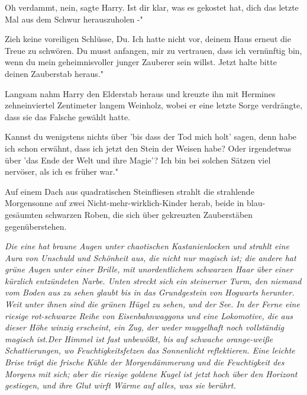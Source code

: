 \glqq Oh verdammt, nein\grqq{}, sagte Harry. \glqq Ist dir klar, was es gekostet
hat, dich das letzte Mal aus dem Schwur herauszuholen -"

\glqq Zieh keine voreiligen Schlüsse, Du. Ich hatte nicht vor, deinem Haus
erneut die Treue zu schwören. Du musst anfangen, mir zu vertrauen, dass ich
vernünftig bin, wenn du mein geheimnisvoller junger Zauberer sein willst. Jetzt
halte bitte deinen Zauberstab heraus."

Langsam nahm Harry den Elderstab heraus und kreuzte ihn mit Hermines
zehneinviertel Zentimeter langem Weinholz, wobei er eine letzte Sorge
verdrängte, dass sie das Falsche gewählt hatte.

\glqq Kannst du wenigstens nichts über 'bis dass der Tod mich holt' sagen, denn
habe ich schon erwähnt, dass ich jetzt den Stein der Weisen habe? Oder
irgendetwas über 'das Ende der Welt und ihre Magie'? Ich bin bei solchen Sätzen
viel nervöser, als ich es früher war."

Auf einem Dach aus quadratischen Steinfliesen strahlt die strahlende Morgensonne
auf zwei Nicht-mehr-wirklich-Kinder herab, beide in blau-gesäumten schwarzen
Roben, die sich über gekreuzten Zauberstäben gegenüberstehen.

\emph{Die eine hat braune Augen unter chaotischen Kastanienlocken und strahlt eine Aura von Unschuld und Schönheit aus, die nicht nur magisch ist; die andere hat grüne Augen unter einer Brille, mit unordentlichem schwarzen Haar über einer kürzlich entzündeten Narbe. Unten streckt sich ein steinerner Turm, den niemand vom Boden aus zu sehen glaubt bis in das Grundgestein von Hogwarts herunter. Weit unter ihnen sind die grünen Hügel zu sehen, und der See. In der Ferne eine riesige rot-schwarze Reihe von Eisenbahnwaggons und eine Lokomotive, die aus dieser Höhe winzig erscheint, ein Zug, der weder muggelhaft noch vollständig magisch ist.Der Himmel ist fast unbewölkt, bis auf schwache orange-weiße Schattierungen, wo Feuchtigkeitsfetzen das Sonnenlicht reflektieren. Eine leichte Brise trägt die frische Kühle der Morgendämmerung und die Feuchtigkeit des Morgens mit sich; aber die riesige goldene Kugel ist jetzt hoch über den Horizont gestiegen, und ihre Glut wirft Wärme auf alles, was sie berührt.}

